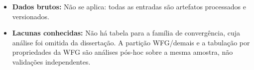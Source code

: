 \begin{itemize}[nosep]
\texttt{results/\allowbreak{}thesis/\allowbreak{}figures/\allowbreak{}fig\_\allowbreak{}hospedeiros\_\allowbreak{}a12.pdf}, \texttt{results/\allowbreak{}thesis/\allowbreak{}figures/\allowbreak{}fig\_\allowbreak{}ativacao\_\allowbreak{}turnover.pdf}, \texttt{results/\allowbreak{}thesis/\allowbreak{}figures/\allowbreak{}fig\_\allowbreak{}posicionamento\_\allowbreak{}a12\_\allowbreak{}igd.pdf}, \texttt{results/\allowbreak{}thesis/\allowbreak{}figures/\allowbreak{}fig\_\allowbreak{}posicionamento\_\allowbreak{}a12\_\allowbreak{}hv.pdf}
    \item \textbf{Dados brutos:} Não se aplica: todas as entradas são artefatos processados e versionados.
    \item \textbf{Lacunas conhecidas:} Não há tabela para a família de convergência, cuja análise foi omitida da dissertação. A partição WFG/demais e a tabulação por propriedades da WFG são análises pós-hoc sobre a mesma amostra, não validações independentes.
\end{itemize}

